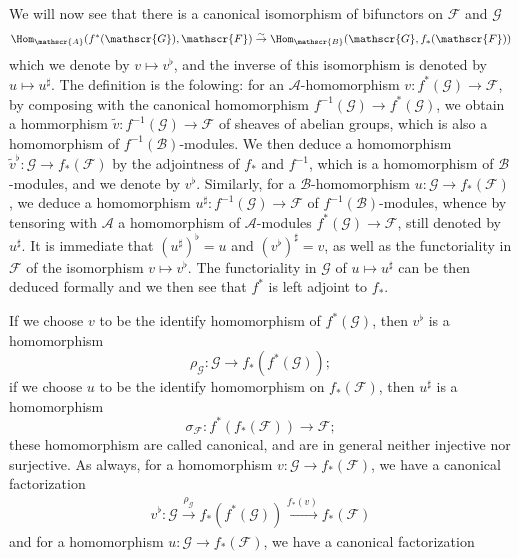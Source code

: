 We will now see that there is a canonical isomorphism of bifunctors on $\mathscr{F}$ and $\mathscr{G}$
\begin{align}\label{ringed space direct and inverse adjoint prop}
\Hom_{\mathscr{A}}(f^*(\mathscr{G}),\mathscr{F})\stackrel{\sim}{\to}\Hom_{\mathscr{B}}(\mathscr{G},f_*(\mathscr{F}))
\end{align}
which we denote by $v\mapsto v^{\flat}$, and the inverse of this isomorphism is denoted by $u\mapsto u^{\sharp}$. The definition is the folowing: for an $\mathscr{A}$-homomorphism $v:f^*(\mathscr{G})\to\mathscr{F}$, by composing with the canonical homomorphism $f^{-1}(\mathscr{G})\to f^*(\mathscr{G})$, we obtain a hommorphism $\tilde{v}:f^{-1}(\mathscr{G})\to\mathscr{F}$ of sheaves of abelian groups, which is also a homomorphism of $f^{-1}(\mathscr{B})$-modules. We then deduce a homomorphism $\tilde{v}^{\flat}:\mathscr{G}\to f_*(\mathscr{F})$ by the adjointness of $f_*$ and $f^{-1}$, which is a homomorphism of $\mathscr{B}$-modules, and we denote by $v^{\flat}$. Similarly, for a $\mathscr{B}$-homomorphism $u:\mathscr{G}\to f_*(\mathscr{F})$, we deduce a homomorphism $u^{\sharp}:f^{-1}(\mathscr{G})\to\mathscr{F}$ of $f^{-1}(\mathscr{B})$-modules, whence by tensoring with $\mathscr{A}$ a homomorphism of $\mathscr{A}$-modules $f^*(\mathscr{G})\to\mathscr{F}$, still denoted by $u^{\sharp}$. It is immediate that $(u^{\sharp})^{\flat}=u$ and $(v^{\flat})^{\sharp}=v$, as well as the functoriality in $\mathscr{F}$ of the isomorphism $v\mapsto v^{\flat}$. The functoriality in $\mathscr{G}$ of $u\mapsto u^{\sharp}$ can be then deduced formally and we then see that $f^*$ is left adjoint to $f_*$.\par
If we choose $v$ to be the identify homomorphism of $f^*(\mathscr{G})$, then $v^{\flat}$ is a homomorphism
\[\rho_{\mathscr{G}}:\mathscr{G}\to f_*(f^*(\mathscr{G}));\]
if we choose $u$ to be the identify homomorphism on $f_*(\mathscr{F})$, then $u^{\sharp}$ is a homomorphism
\[\sigma_{\mathscr{F}}:f^*(f_*(\mathscr{F}))\to\mathscr{F};\]
these homomorphism are called canonical, and are in general neither injective nor surjective. As always, for a homomorphism $v:\mathscr{G}\to f_*(\mathscr{F})$, we have a canonical factorization
\begin{align}\label{ringed space v^flat factorization by rho}
v^{\flat}:\mathscr{G}\stackrel{\rho_{\mathscr{G}}}{\to}f_*(f^*(\mathscr{G}))\stackrel{f_*(v)}{\to}f_*(\mathscr{F})
\end{align}
and for a homomorphism $u:\mathscr{G}\to f_*(\mathscr{F})$, we have a canonical factorization
